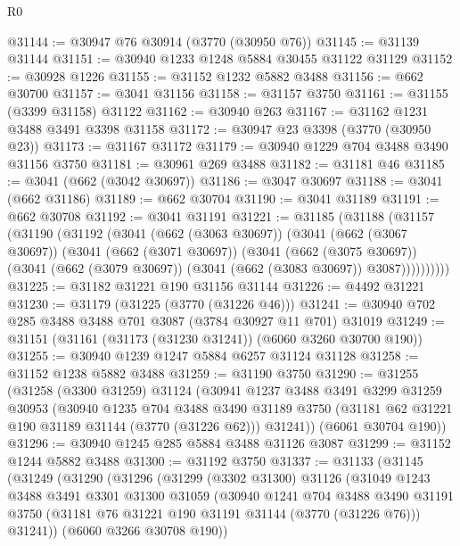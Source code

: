 \begin{lexlean}{R0}
\begin{coremodule}
@31144 := @30947 @76 @30914 (@3770 (@30950 @76))
@31145 := @31139 @31144
@31151 := @30940 @1233 @1248 @5884 @30455 @31122 @31129
@31152 := @30928 @1226
@31155 := @31152 @1232 @5882 @3488
@31156 := @662 @30700
@31157 := @3041 @31156
@31158 := @31157 @3750
@31161 := @31155 (@3399 @31158) @31122
@31162 := @30940 @263
@31167 := @31162 @1231 @3488 @3491 @3398 @31158
@31172 := @30947 @23 @3398 (@3770 (@30950 @23))
@31173 := @31167 @31172
@31179 := @30940 @1229 @704 @3488 @3490 @31156 @3750
@31181 := @30961 @269 @3488
@31182 := @31181 @46
@31185 := @3041 (@662 (@3042 @30697))
@31186 := @3047 @30697
@31188 := @3041 (@662 @31186)
@31189 := @662 @30704
@31190 := @3041 @31189
@31191 := @662 @30708
@31192 := @3041 @31191
@31221 := @31185
    (@31188
      (@31157
        (@31190
          (@31192
            (@3041
              (@662 (@3063 @30697))
              (@3041
                (@662 (@3067 @30697))
                (@3041
                  (@662 (@3071 @30697))
                  (@3041
                    (@662 (@3075 @30697))
                    (@3041 (@662 (@3079 @30697)) (@3041 (@662 (@3083 @30697)) @3087))))))))))
@31225 := @31182 @31221 @190 @31156 @31144
@31226 := @4492 @31221
@31230 := @31179 (@31225 (@3770 (@31226 @46)))
@31241 := @30940 @702 @285 @3488 @3488 @701 @3087 (@3784 @30927 @11 @701) @31019
@31249 := @31151 (@31161 (@31173 (@31230 @31241)) (@6060 @3260 @30700 @190))
@31255 := @30940 @1239 @1247 @5884 @6257 @31124 @31128
@31258 := @31152 @1238 @5882 @3488
@31259 := @31190 @3750
@31290 := @31255
    (@31258
      (@3300 @31259)
      @31124
      (@30941
        @1237
        @3488
        @3491
        @3299
        @31259
        @30953
        (@30940
          @1235
          @704
          @3488
          @3490
          @31189
          @3750
          (@31181 @62 @31221 @190 @31189 @31144 (@3770 (@31226 @62)))
          @31241))
      (@6061 @30704 @190))
@31296 := @30940 @1245 @285 @5884 @3488 @31126 @3087
@31299 := @31152 @1244 @5882 @3488
@31300 := @31192 @3750
@31337 := @31133
    (@31145
      (@31249
        (@31290
          (@31296
            (@31299
              (@3302 @31300)
              @31126
              (@31049
                @1243
                @3488
                @3491
                @3301
                @31300
                @31059
                (@30940
                  @1241
                  @704
                  @3488
                  @3490
                  @31191
                  @3750
                  (@31181 @76 @31221 @190 @31191 @31144 (@3770 (@31226 @76)))
                  @31241))
              (@6060 @3266 @30708 @190))

\end{coremodule}
\end{lexlean}
